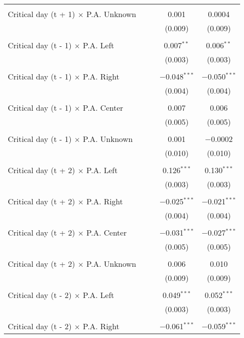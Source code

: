 \documentclass[
]{article}
\begin{document}
\begin{table}[!htbp]
{\begin{tabular}{@{\extracolsep{5pt}}lcccc}
  & & & & \\ 
 Critical day (t + 1) $\times$ P.A. Unknown &  &  & 0.001 & 0.0004 \\ 
  &  &  & (0.009) & (0.009) \\ 
  & & & & \\ 
 Critical day (t - 1) $\times$ P.A. Left &  &  & 0.007$^{**}$ & 0.006$^{**}$ \\ 
  &  &  & (0.003) & (0.003) \\ 
  & & & & \\ 
 Critical day (t - 1) $\times$ P.A. Right &  &  & $-$0.048$^{***}$ & $-$0.050$^{***}$ \\ 
  &  &  & (0.004) & (0.004) \\ 
  & & & & \\ 
 Critical day (t - 1) $\times$ P.A. Center &  &  & 0.007 & 0.006 \\ 
  &  &  & (0.005) & (0.005) \\ 
  & & & & \\ 
 Critical day (t - 1) $\times$ P.A. Unknown &  &  & 0.001 & $-$0.0002 \\ 
  &  &  & (0.010) & (0.010) \\ 
  & & & & \\ 
 Critical day (t + 2) $\times$ P.A. Left &  &  & 0.126$^{***}$ & 0.130$^{***}$ \\ 
  &  &  & (0.003) & (0.003) \\ 
  & & & & \\ 
 Critical day (t + 2) $\times$ P.A. Right &  &  & $-$0.025$^{***}$ & $-$0.021$^{***}$ \\ 
  &  &  & (0.004) & (0.004) \\ 
  & & & & \\ 
 Critical day (t + 2) $\times$ P.A. Center &  &  & $-$0.031$^{***}$ & $-$0.027$^{***}$ \\ 
  &  &  & (0.005) & (0.005) \\ 
  & & & & \\ 
 Critical day (t + 2) $\times$ P.A. Unknown &  &  & 0.006 & 0.010 \\ 
  &  &  & (0.009) & (0.009) \\ 
  & & & & \\ 
 Critical day (t - 2) $\times$ P.A. Left &  &  & 0.049$^{***}$ & 0.052$^{***}$ \\ 
  &  &  & (0.003) & (0.003) \\ 
  & & & & \\ 
 Critical day (t - 2) $\times$ P.A. Right &  &  & $-$0.061$^{***}$ & $-$0.059$^{***}$ \\ 

\end{tabular}}
\end{table}
\end{document}
